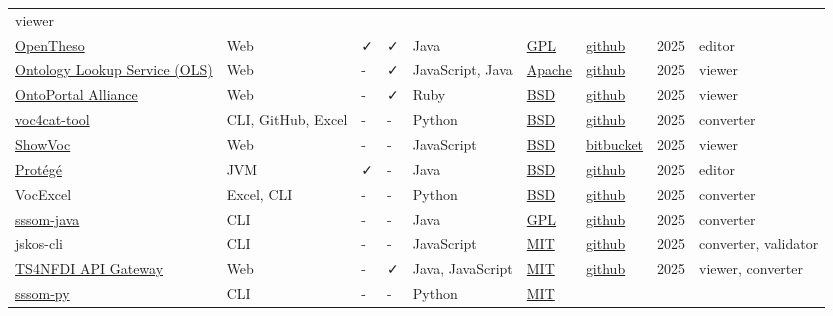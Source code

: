 \documentclass[
  DIV=10]{article}
\begin{document}
\begin{longtable}[]{@{}lllllllll@{}}
viewer \\
\href{https://opentheso.hypotheses.org/}{OpenTheso} & Web & ✓ & ✓ & Java
& \href{https://spdx.org/licenses/GPL-3.0-or-later}{GPL} &
\href{https://github.com/miledrousset/Opentheso}{github} & 2025 &
editor \\
\href{https://github.com/EBISPOT/ols4}{Ontology Lookup Service (OLS)} &
Web & - & ✓ & JavaScript, Java &
\href{https://spdx.org/licenses/Apache-2.0}{Apache} &
\href{https://github.com/EBISPOT/OLS}{github} & 2025 & viewer \\
\href{https://ontoportal.org/}{OntoPortal Alliance} & Web & - & ✓ & Ruby
& \href{https://spdx.org/licenses/BSD-3-Clause}{BSD} &
\href{https://github.com/ontoportal}{github} & 2025 & viewer \\
\href{https://github.com/nfdi4cat/voc4cat-tool/}{voc4cat-tool} & CLI,
GitHub, Excel & - & - & Python &
\href{https://spdx.org/licenses/BSD-3-Clause}{BSD} &
\href{https://github.com/nfdi4cat/voc4cat-tool/}{github} & 2025 &
converter \\
\href{https://showvoc.uniroma2.it/}{ShowVoc} & Web & - & - & JavaScript
& \href{https://spdx.org/licenses/BSD-3-Clause}{BSD} &
\href{https://bitbucket.org/art-uniroma2/showvoc/src/master/}{bitbucket}
& 2025 & viewer \\
\href{https://protege.stanford.edu/}{Protégé} & JVM & ✓ & - & Java &
\href{https://spdx.org/licenses/BSD-3-Clause}{BSD} &
\href{https://github.com/protegeproject/protege}{github} & 2025 &
editor \\
VocExcel & Excel, CLI & - & - & Python &
\href{https://spdx.org/licenses/BSD-3-Clause}{BSD} &
\href{https://github.com/Kurrawong/VocExcel}{github} & 2025 &
converter \\
\href{https://incenp.org/dvlpt/sssom-java/}{sssom-java} & CLI & - & - &
Java & \href{https://spdx.org/licenses/GPL-3.0-or-later}{GPL} &
\href{https://github.com/gouttegd/sssom-java}{github} & 2025 &
converter \\
jskos-cli & CLI & - & - & JavaScript &
\href{https://spdx.org/licenses/MIT}{MIT} &
\href{https://github.com/gbv/jskos-cli/}{github} & 2025 & converter,
validator \\
\href{https://ts4nfdi.github.io/api-gateway/}{TS4NFDI API Gateway} & Web
& - & ✓ & Java, JavaScript & \href{https://spdx.org/licenses/MIT}{MIT} &
\href{https://github.com/ts4nfdi/api-gateway}{github} & 2025 & viewer,
converter \\
\href{https://mapping-commons.github.io/sssom-py}{sssom-py} & CLI & - &
- & Python & \href{https://spdx.org/licenses/MIT}{MIT} &

\end{longtable}
\end{document}
